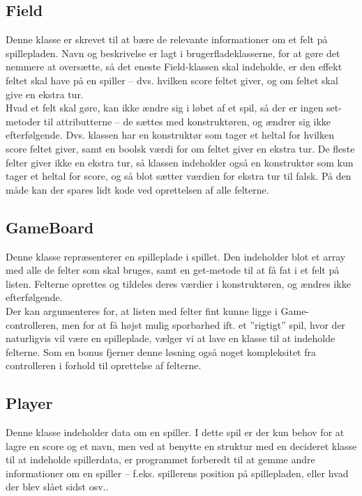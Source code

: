 \subsection{Field}
Denne klasse er skrevet til at bære de relevante informationer om et felt på spillepladen. Navn og beskrivelse er lagt i brugerfladeklasserne, for at gøre det nemmere at oversætte, så det eneste Field-klassen skal indeholde, er den effekt feltet skal have på en spiller – dvs. hvilken score feltet giver, og om feltet skal give en ekstra tur.
\\

Hvad et felt skal gøre, kan ikke ændre sig i løbet af et spil, så der er ingen set-metoder til attributterne – de sættes med konstruktøren, og ændrer sig ikke efterfølgende. Dvs. klassen har en konstruktør som tager et heltal for hvilken score feltet giver, samt en boolsk værdi for om feltet giver en ekstra tur.
De fleste felter giver ikke en ekstra tur, så klassen indeholder også en konstruktør som kun tager et heltal for score, og så blot sætter værdien for ekstra tur til falsk. På den måde kan der spares lidt kode ved oprettelsen af alle felterne.
\subsection{GameBoard}
Denne klasse repræsenterer en spilleplade i spillet. Den indeholder blot et array med alle de felter som skal bruges, samt en get-metode til at få fat i et felt på listen. Felterne oprettes og tildeles deres værdier i konstruktøren, og ændres ikke efterfølgende.
\\

Der kan argumenteres for, at listen med felter fint kunne ligge i Game-controlleren, men for at få højst mulig sporbarhed ift. et ”rigtigt” spil, hvor der naturligvis vil være en spilleplade, vælger vi at lave en klasse til at indeholde felterne. Som en bonus fjerner denne løsning også noget kompleksitet fra controlleren i forhold til oprettelse af felterne.
\subsection{Player}
Denne klasse indeholder data om en spiller. I dette spil er der kun behov for at lagre en score og et navn, men ved at benytte en struktur med en decideret klasse til at indeholde spillerdata, er programmet forberedt til at gemme andre informationer om en spiller – f.eks. spillerens position på spillepladen, eller hvad der blev slået sidst osv..
\\

